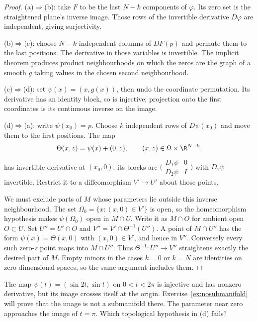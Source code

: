\begin{proof}
(a)$\Rightarrow$(b): take $F$ to be the last $N-k$ components of $\varphi$. Its zero set is the straightened plane's inverse image. Those rows of the invertible derivative $D\varphi$ are independent, giving surjectivity.

(b)$\Rightarrow$(c): choose $N-k$ independent columns of $DF(p)$ and permute them to the last positions. The derivative in those variables is invertible. The implicit theorem produces product neighbourhoods on which the zeros are the graph of a smooth $g$ taking values in the chosen second neighbourhood.

(c)$\Rightarrow$(d): set $\psi(x)=(x,g(x))$, then undo the coordinate permutation. Its derivative has an identity block, so is injective; projection onto the first coordinates is its continuous inverse on the image.

(d)$\Rightarrow$(a): write $\psi(x_0)=p$. Choose $k$ independent rows of $D\psi(x_0)$ and move them to the first positions. The map
\[
\Theta(x,z)=\psi(x)+(0,z),\qquad (x,z)\in\Omega\times\R^{N-k},
\]
has invertible derivative at $(x_0,0)$: its blocks are
$\bigl(\begin{smallmatrix}D_1\psi&0\\D_2\psi&I\end{smallmatrix}\bigr)$ with $D_1\psi$ invertible. Restrict it to a diffeomorphism $V'\to U'$ about those points.

We must exclude parts of $M$ whose parameters lie outside this inverse neighbourhood. The set $\Omega_0=\{x:(x,0)\in V'\}$ is open, so the homeomorphism hypothesis makes $\psi(\Omega_0)$ open in $M\cap U$. Write it as $M\cap O$ for ambient open $O\subset U$. Set $U''=U'\cap O$ and $V''=V'\cap\Theta^{-1}(U'')$. A point of $M\cap U''$ has the form $\psi(x)=\Theta(x,0)$ with $(x,0)\in V'$, and hence in $V''$. Conversely every such zero-$z$ point maps into $M\cap U''$. Thus $\Theta^{-1}:U''\to V''$ straightens exactly the desired part of $M$. Empty minors in the cases $k=0$ or $k=N$ are identities on zero-dimensional spaces, so the same argument includes them.
\end{proof}

\begin{think}
The map $\psi(t)=(\sin2t,\sin t)$ on $0<t<2\pi$ is injective and has nonzero derivative, but its image crosses itself at the origin. Exercise~\ref{ex:nosubmanifold} will prove that the image is not a submanifold there. The parameter near zero approaches the image of $t=\pi$. Which topological hypothesis in (d) fails?
\end{think}

